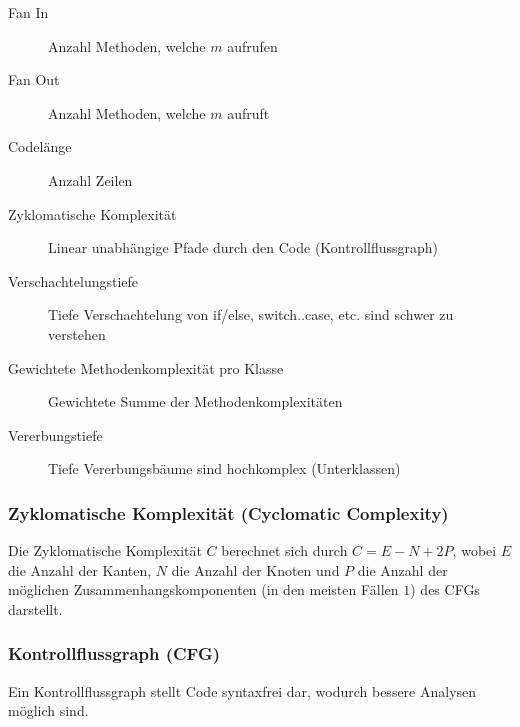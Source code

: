 \documentclass[
    ngerman,
    color=3b,
    summary,
    boxarc,
    main,
]{rubos-tuda-template}
\begin{document}
\begin{description}
    \item[Fan In] Anzahl Methoden, welche $ m $ aufrufen
    \item[Fan Out] Anzahl Methoden, welche $ m $ aufruft
    \item[Codelänge] Anzahl Zeilen
    \item[Zyklomatische Komplexität] Linear unabhängige Pfade durch den Code (Kontrollflussgraph)
    \item[Verschachtelungstiefe] Tiefe Verschachtelung von if/else, switch..case, etc. sind schwer zu verstehen
    \item[Gewichtete Methodenkomplexität pro Klasse] Gewichtete Summe der Methodenkomplexitäten
    \item[Vererbungstiefe] Tiefe Vererbungsbäume sind hochkomplex (Unterklassen)
\end{description}

\subsubsection{Zyklomatische Komplexität (Cyclomatic Complexity)}
Die Zyklomatische Komplexität $ C $ berechnet sich durch $ C = E - N + 2P $, wobei $ E $ die Anzahl der Kanten, $ N $ die Anzahl der Knoten und $ P $ die Anzahl der möglichen Zusammenhangskomponenten (in den meisten Fällen $ 1 $) des CFGs darstellt.

\subsubsection{Kontrollflussgraph (CFG)}
\label{diagram:cfg}

Ein Kontrollflussgraph stellt Code syntaxfrei dar, wodurch bessere Analysen möglich sind.
\end{document}
